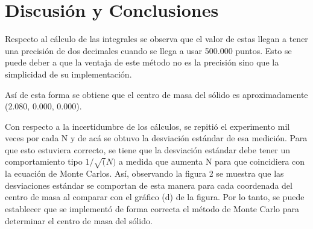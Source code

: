 \documentclass[letterpaper,oneside]{article}
\begin{document}
\newpage
\section{Discusión y Conclusiones}
Respecto al cálculo de las integrales se observa que el valor de estas llegan a tener una precisión de dos decimales cuando se llega a usar 500.000 puntos. Esto se puede deber a que la ventaja de este método no es la precisión sino que la simplicidad de su implementación.

Así de esta forma se obtiene que el centro de masa del sólido es aproximadamente (2.080, 0.000, 0.000). 

Con respecto a la incertidumbre de los cálculos, se repitió el experimento mil veces por cada N y de acá se obtuvo la desviación estándar de esa medición. Para que esto estuviera correcto, se tiene que la desviación estándar debe tener un comportamiento tipo $1/\sqrt(N)$ a medida que aumenta N para que coincidiera con la ecuación de Monte Carlos. Así, observando la figura 2 se muestra que las desviaciones estándar se comportan de esta manera para cada coordenada del centro de masa al comparar con el gráfico (d) de la figura. Por lo tanto, se puede establecer que se implementó de forma correcta el método de Monte Carlo para determinar el centro de masa del sólido. 


\end{document}
